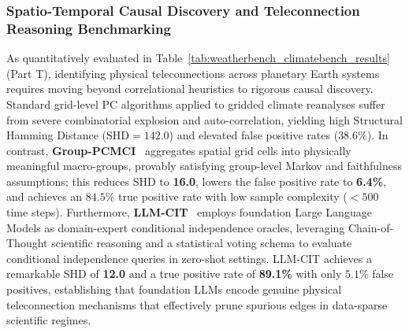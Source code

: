 \subsubsection{Spatio-Temporal Causal Discovery and Teleconnection Reasoning Benchmarking}
As quantitatively evaluated in Table~\ref{tab:weatherbench_climatebench_results} (Part T), identifying physical teleconnections across planetary Earth systems requires moving beyond correlational heuristics to rigorous causal discovery. Standard grid-level PC algorithms applied to gridded climate reanalyses suffer from severe combinatorial explosion and auto-correlation, yielding high Structural Hamming Distance ($\text{SHD} = 142.0$) and elevated false positive rates ($38.6\%$). In contrast, \textbf{Group-PCMCI}~\cite{wahl2023groupcausal} aggregates spatial grid cells into physically meaningful macro-groups, provably satisfying group-level Markov and faithfulness assumptions; this reduces SHD to \textbf{16.0}, lowers the false positive rate to \textbf{6.4\%}, and achieves an $84.5\%$ true positive rate with low sample complexity ($<500$ time steps). Furthermore, \textbf{LLM-CIT}~\cite{cohrs2024llmcausal} employs foundation Large Language Models as domain-expert conditional independence oracles, leveraging Chain-of-Thought scientific reasoning and a statistical voting schema to evaluate conditional independence queries in zero-shot settings. LLM-CIT achieves a remarkable SHD of \textbf{12.0} and a true positive rate of \textbf{89.1\%} with only $5.1\%$ false positives, establishing that foundation LLMs encode genuine physical teleconnection mechanisms that effectively prune spurious edges in data-sparse scientific regimes.

